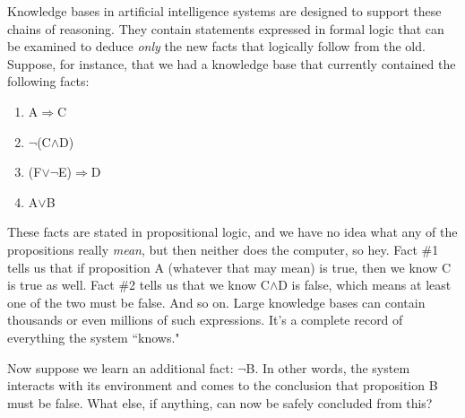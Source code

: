 Knowledge bases in artificial intelligence systems are designed to support
these chains of reasoning. They contain statements expressed in formal
logic that can be examined to deduce \textit{only} the new facts that
logically follow from the old. Suppose, for instance, that we had a
knowledge base that currently contained the following facts:
\begin{center}
\begin{enumerate}
\item A$\Rightarrow$C
\item $\neg$(C$\wedge $D)
\item (F$\vee \neg$E)$\Rightarrow$D
\item A$\vee$B
\end{enumerate}
\end{center}
These facts are stated in propositional logic, and we have no idea what any
of the propositions really \textit{mean}, but then neither does the
computer, so hey. Fact \#1 tells us that if proposition A (whatever that
may mean) is true, then we know C is true as well. Fact \#2 tells us that
we know C$\wedge$D is false, which means at least one of the two must be
false. And so on. Large knowledge bases can contain thousands or even
millions of such expressions.  It's a complete record of everything the
system ``knows."

Now suppose we learn an additional fact: $\neg$B. In other words, the
system interacts with its environment and comes to the conclusion that
proposition B must be false. What else, if anything, can now be safely
concluded from this?

